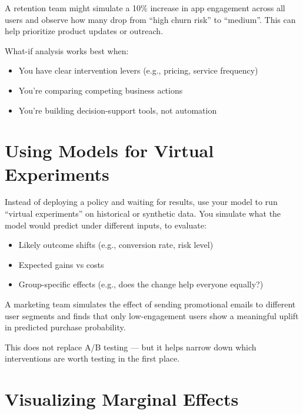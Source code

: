 \documentclass[12pt,openany]{book}
\begin{document}
\begin{examplebox}
A retention team might simulate a 10\% increase in app engagement across all users and observe how many drop from ``high churn risk'' to ``medium''. This can help prioritize product updates or outreach.
\end{examplebox}

What-if analysis works best when:
\begin{itemize}
  \item You have clear intervention levers (e.g., pricing, service frequency)
  \item You're comparing competing business actions
  \item You're building decision-support tools, not automation
\end{itemize}

\section{Using Models for Virtual Experiments}

Instead of deploying a policy and waiting for results, use your model to run “virtual experiments” on historical or synthetic data. You simulate what the model would predict under different inputs, to evaluate:
\begin{itemize}
  \item Likely outcome shifts (e.g., conversion rate, risk level)
  \item Expected gains vs costs
  \item Group-specific effects (e.g., does the change help everyone equally?)
\end{itemize}

\begin{examplebox}
A marketing team simulates the effect of sending promotional emails to different user segments and finds that only low-engagement users show a meaningful uplift in predicted purchase probability.
\end{examplebox}

\begin{notebox}
This does not replace A/B testing — but it helps narrow down which interventions are worth testing in the first place.
\end{notebox}

\section{Visualizing Marginal Effects}
\end{document}
